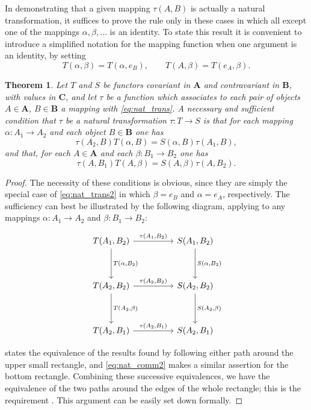 \documentclass[11pt,a4paper]{report}
\newtheorem{theorem}{Theorem}
\begin{document}
In demonstrating that a given mapping $\tau(A,B)$ is actually a natural transformation, it suffices to
prove the rule  only in these cases in which all except one of the mappings
$\alpha,\beta,\dotsc$ is an identity. To state this result it is convenient to introduce a simplified 
notation for the mapping function when one argument is an identity, by setting
\begin{equation*}
	T(\alpha,\beta) = T(\alpha,e_B),\qquad T(A,\beta)= T(e_A,\beta).
\end{equation*}
\begin{theorem}\label{thm:nat_trans}
	Let $T$ and $S$ be functors covariant in $\mathbf{A}$ and contravariant in $\mathbf{B}$,
	with values in $\mathbf{C}$, and let $\tau$ be a function which associates to each pair of
	objects $A\in\mathbf{A}$, $B\in\mathbf{B}$ a mapping with \cref{eq:nat_trans}. A necessary
	and sufficient condition that $\tau$ be a natural transformation $\tau:T\rightarrow S$ is
	that for each mapping $\alpha:A_1\rightarrow A_2$ and each object $B\in\mathbf{B}$ one has
	\begin{equation}\label{eq:nat_comm}
		\tau(A_2,B) T(\alpha,B) = S(\alpha,B)\tau(A_1,B),
	\end{equation}
	and that, for each $A\in\mathbf{A}$ and each $\beta:B_1\rightarrow B_2$ one has
	\begin{equation}\label{eq:nat_comm2}
		\tau(A,B_1) T(A,\beta) = S(A,\beta)\tau(A,B_2).
	\end{equation}
\end{theorem}
\begin{proof}
	The necessity of these conditions is obvious, since they are simply the special case of \cref{eq:nat_trans2}
	in which $\beta=e_B$ and $\alpha=e_A$, respectively. The sufficiency
	can best be illustrated by the following diagram, applying to any mappings $\alpha:A_1\rightarrow A_2$
	and $\beta:B_1\rightarrow B_2$:
	\begin{equation*}
	\begin{tikzpicture}
	\node (a) at (0,0)
	{ \begin{tikzcd}[sep=huge]
		T({A_1,B_2}) \arrow[r,"{\tau(A_1,B_2)}"] \arrow[d, "{T(\alpha,B_2)}"] & S(A_1,B_2) 
		\arrow[d,"{S(\alpha,B_2)}"] \\
		T(A_2,B_2) \arrow[r,"{\tau(A_2,B_2)}"] \arrow[d, "{T(A_2,\beta)}"] & S(A_2,B_2)
		\arrow[d,"{S(A_2,\beta)}"] \\
		T(A_2,B_1) \arrow[r,"{\tau(A_2,B_1)}"] & S(A_2,B_1)
	\end{tikzcd}};
	\end{tikzpicture}
	\end{equation*}
	 states the equivalence of the results found by following 
	either path around the upper small rectangle, and \cref{eq:nat_comm2} makes
	a similar assertion for the bottom rectangle. Combining these successive equivalences,
	we have the equivalence of the two paths around the edges of the whole rectangle; this
	is the requirement . This argument can be easily set down formally.
	
\end{proof}
\end{document}
